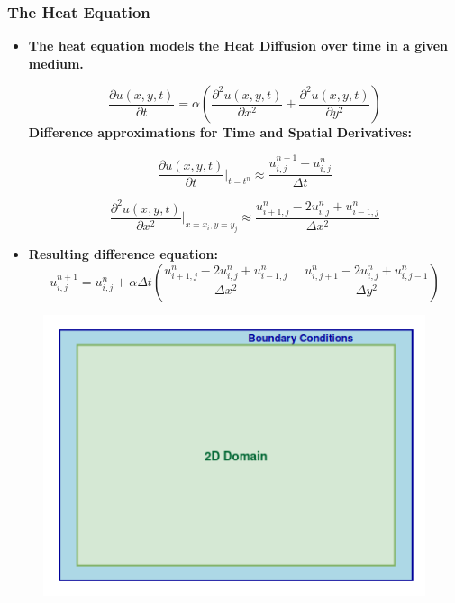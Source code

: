 \documentclass[9pt]{beamer}
\begin{document}
\begin{frame}
\vspace{-0.1\baselineskip} %

\frametitle{The Heat Equation}
\scriptsize
\begin{itemize}
    \item \textbf{The heat equation models the Heat Diffusion over time in a given medium.}

    \[
    \frac{\partial u(x, y, t)}{\partial t} = \alpha \left( \frac{\partial^2 u(x, y, t)}{\partial x^2} + \frac{\partial^2 u(x, y, t)}{\partial y^2} \right)
    \]
\textbf{Difference approximations for Time and Spatial Derivatives:}
\begin{minipage}{0.45\textwidth}

     \[
\frac{\partial u(x, y, t)}{\partial t}\Bigg|_{t = t^n} \approx \frac{u_{i,j}^{n+1} - u_{i,j}^n}{\Delta t}
\]
\end{minipage}
\begin{minipage}{0.45\textwidth}

\[
\frac{\partial^2 u(x, y, t)}{\partial x^2}\Bigg|_{x = x_i, y = y_j} \approx \frac{u_{i+1,j}^n - 2u_{i,j}^n + u_{i-1,j}^n}{\Delta x^2}
\]
\end{minipage}
\item \textbf{Resulting difference equation:}
\[
u_{i,j}^{n+1} = u_{i,j}^n + \alpha \Delta t \left( \frac{u_{i+1,j}^n - 2u_{i,j}^n + u_{i-1,j}^n}{\Delta x^2} + \frac{u_{i,j+1}^n - 2u_{i,j}^n + u_{i,j-1}^n}{\Delta y^2} \right)
\]
\end{itemize}
\vspace{-0.3\baselineskip}
\begin{figure}
    \centering
    \includegraphics[width=0.45\linewidth,height=0.35\linewidth]{Screenshot from 2024-08-30 14-04-56.png}
\end{figure}
\end{frame}
\end{document}
